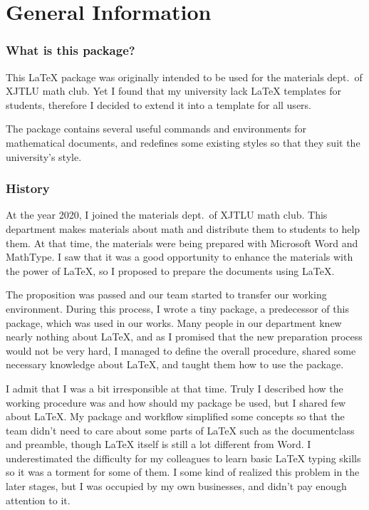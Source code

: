 \part{General Information}
\pagestyle{headings}
\section{What is this package?}
This \LaTeX{} package was originally intended to be used for the materials dept.~of XJTLU math club. Yet I found that my university lack \LaTeX{} templates for students, therefore I decided to extend it into a template for all users.

The package contains several useful commands and environments for mathematical documents, and redefines some existing styles so that they suit the university's style.

\section{History}
At the year 2020, I joined the materials dept.~of XJTLU math club. This department makes materials about math and distribute them to students to help them. At that time, the materials were being prepared with Microsoft Word and MathType. I saw that it was a good opportunity to enhance the materials with the power of \LaTeX, so I proposed to prepare the documents using \LaTeX.

The proposition was passed and our team started to transfer our working environment. During this process, I wrote a tiny package, a predecessor of this package, which was used in our works. Many people in our department knew nearly nothing about \LaTeX, and as I promised that the new preparation process would not be very hard, I managed to define the overall procedure, shared some necessary knowledge about \LaTeX, and taught them how to use the package.

I admit that I was a bit irresponsible at that time. Truly I described how the working procedure was and how should my package be used, but I shared few about \LaTeX. My package and workflow simplified some concepts so that the team didn't need to care about some parts of \LaTeX{} such as the documentclass and preamble, though \LaTeX{} itself is still a lot different from Word. I underestimated the difficulty for my colleagues to learn basic \LaTeX{} typing skills so it was a torment for some of them. I some kind of realized this problem in the later stages, but I was occupied by my own businesses, and didn't pay enough attention to it.

